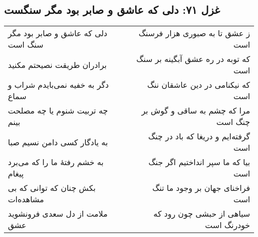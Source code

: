 \begin{center}
\section*{غزل ۷۱: دلی که عاشق و صابر بود مگر سنگست}
\label{sec:071}
\begin{longtable}{l p{0.5cm} r}
دلی که عاشق و صابر بود مگر سنگ است
&&
ز عشق تا به صبوری هزار فرسنگ است
\\
برادران طریقت نصیحتم مکنید
&&
که توبه در ره عشق آبگینه بر سنگ است
\\
دگر به خفیه نمی‌بایدم شراب و سماع
&&
که نیکنامی در دین عاشقان ننگ است
\\
چه تربیت شنوم یا چه مصلحت بینم
&&
مرا که چشم به ساقی و گوش بر چنگ است
\\
به یادگار کسی دامن نسیم صبا
&&
گرفته‌ایم و دریغا که باد در چنگ است
\\
به خشم رفتهٔ ما را که می‌برد پیغام
&&
بیا که ما سپر انداختیم اگر جنگ است
\\
بکش چنان که توانی که بی مشاهده‌ات
&&
فراخنای جهان بر وجود ما تنگ است
\\
ملامت از دل سعدی فرونشوید عشق
&&
سیاهی از حبشی چون رود که خودرنگ است
\\
\end{longtable}
\end{center}
